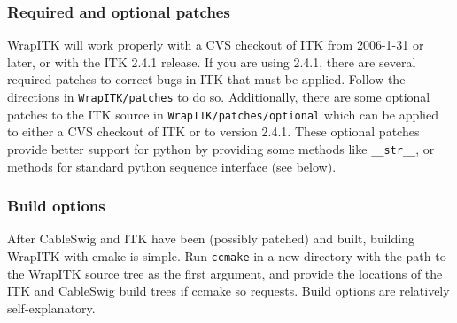 \documentclass{InsightArticle}
\begin{document}
    \subsubsection{Required and optional patches}

WrapITK will work properly with a CVS checkout of ITK from 2006-1-31 or later,
or with the ITK 2.4.1 release. If you are using 2.4.1, there are several
required patches to correct bugs in ITK that must be applied. Follow the
directions in \verb$WrapITK/patches$ to do so. Additionally, there are some optional
patches to the ITK source in \verb$WrapITK/patches/optional$ which can be applied to
either a CVS checkout of ITK or to version 2.4.1. These optional patches provide
better support for python by providing some methods like \verb$__str__$, or methods
for standard python sequence interface (see below).

    \subsubsection{Build options}

After CableSwig and ITK have been (possibly patched) and built, building WrapITK
with cmake is simple. Run \verb$ccmake$ in a new directory with the path to the WrapITK
source tree as the first argument, and provide the locations of the ITK and
CableSwig build trees if ccmake so requests. Build options are relatively
self-explanatory.
\end{document}
